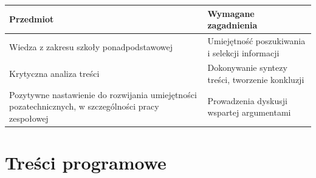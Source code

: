 \documentclass[12pt, a4paper]{article}
\newcommand{\thdrule}{\noalign{\global\setlength{\extrarowheight}{0pt}}}
\newcommand{\thdend}{\noalign{\global\setlength{\extrarowheight}{3pt}}}
\begin{document}
{\scriptsize
\begin{tabularx}{\textwidth}{m{5cm}Y}
\thdrule\toprule
{} {\color{white}\textbf{Przedmiot}} & {\color{white}\textbf{Wymagane zagadnienia}} \\
\midrule\thdend
   Wiedza z zakresu szkoły ponadpodstawowej & Umiejętność poszukiwania i selekcji informacji \\
   Krytyczna analiza treści & Dokonywanie syntezy treści, tworzenie konkluzji \\
   Pozytywne nastawienie do rozwijania umiejętności pozatechnicznych, w szczególności pracy zespołowej & Prowadzenia dyskusji wspartej argumentami \\
\bottomrule
\end{tabularx}}

\section{Treści programowe}
\end{document}
